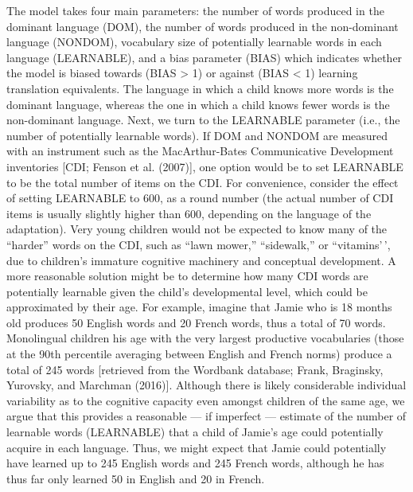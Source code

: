 \documentclass[
  english,
  ,man,floatsintext]{apa6}
\begin{document}
The model takes four main parameters: the number of words produced in the dominant language (DOM), the number of words produced in the non-dominant language (NONDOM), vocabulary size of potentially learnable words in each language (LEARNABLE), and a bias parameter (BIAS) which indicates whether the model is biased towards (BIAS \textgreater{} 1) or against (BIAS \textless{} 1) learning translation equivalents. The language in which a child knows more words is the dominant language, whereas the one in which a child knows fewer words is the non-dominant language.
Next, we turn to the LEARNABLE parameter (i.e., the number of potentially learnable words). If DOM and NONDOM are measured with an instrument such as the MacArthur-Bates Communicative Development inventories {[}CDI; Fenson et al. (2007){]}, one option would be to set LEARNABLE to be the total number of items on the CDI. For convenience, consider the effect of setting LEARNABLE to 600, as a round number (the actual number of CDI items is usually slightly higher than 600, depending on the language of the adaptation). Very young children would not be expected to know many of the ``harder'' words on the CDI, such as ``lawn mower,'' ``sidewalk,'' or ``vitamins'\,', due to children's immature cognitive machinery and conceptual development. A more reasonable solution might be to determine how many CDI words are potentially learnable given the child's developmental level, which could be approximated by their age. For example, imagine that Jamie who is 18 months old produces 50 English words and 20 French words, thus a total of 70 words. Monolingual children his age with the very largest productive vocabularies (those at the 90th percentile averaging between English and French norms) produce a total of 245 words {[}retrieved from the Wordbank database; Frank, Braginsky, Yurovsky, and Marchman (2016){]}. Although there is likely considerable individual variability as to the cognitive capacity even amongst children of the same age, we argue that this provides a reasonable --- if imperfect --- estimate of the number of learnable words (LEARNABLE) that a child of Jamie's age could potentially acquire in each language. Thus, we might expect that Jamie could potentially have learned up to 245 English words and 245 French words, although he has thus far only learned 50 in English and 20 in French.
\end{document}
